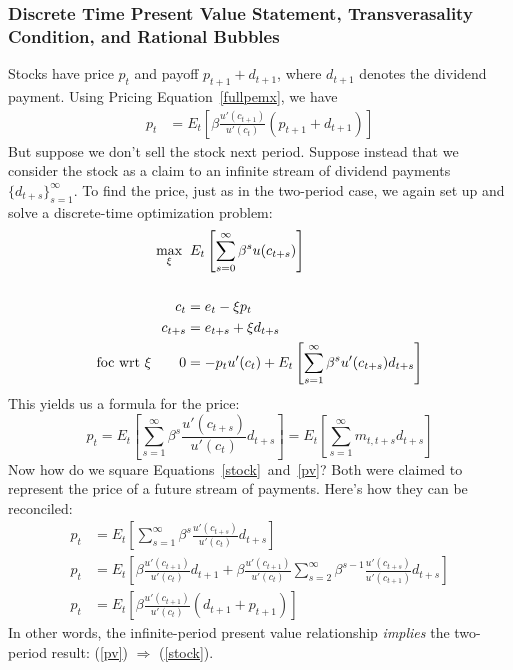 \documentclass[12pt]{article}
\theoremstyle{plain}
\theoremstyle{definition}
\theoremstyle{remark}
\begin{document}
\subsubsection{Discrete Time Present Value Statement, Transverasality
Condition, and Rational Bubbles}

Stocks have price $p_t$ and payoff $p_{t+1} + d_{t+1}$, where $d_{t+1}$
denotes the dividend payment. Using Pricing Equation~\ref{fullpemx}, we
have
\begin{align}
  p_t &= E_t\left[
  \beta\frac{u'(c_{t+1})}{u'(c_{t})} (p_{t+1}+d_{t+1}) \right]
  \label{stock}
\end{align}
But suppose we don't sell the stock next period. Suppose instead that we
consider the stock as a claim to an infinite stream of dividend payments
$\{d_{t+s}\}_{s=1}^\infty$. To find the price, just as in the two-period
case, we again set up and solve a discrete-time optimization problem:
\begin{align}
  \max_{\xi} \; & \;
  E_t \left[ \sum^\infty_{s=0} \beta^s u(c_{t+s}) \right]
  \label{infobjfcn}\\\notag\\
    c_t &= e_t - \xi p_t \notag \\
    c_{t+s} &= e_{t+s} + \xi d_{t+s} \notag \\
    \text{foc wrt $\xi$} \qquad 0 &= -p_t u'(c_t) +
  E_t \left[\sum^\infty_{s=1} \beta^s u'(c_{t+s}) d_{t+s}\right]
\end{align}
This yields us a formula for the price:
\begin{equation}
    p_t =
    E_t \left[\sum^\infty_{s=1} \beta^s \frac{u'(c_{t+s})}{u'(c_t)}
    d_{t+s}\right]
    =
    E_t \left[\sum^\infty_{s=1} m_{t,t+s} d_{t+s}\right]
    \label{pv}
\end{equation}
Now how do we square Equations~\ref{stock}~and~\ref{pv}? Both were
claimed to represent the price of a future stream of payments. Here's
how they can be reconciled:
\begin{align*}
  p_t
  &= E_t \left[
    \sum^\infty_{s=1} \beta^s \frac{u'(c_{t+s})}{u'(c_t)} d_{t+s}
  \right] \\
  p_t&= E_t \left[
  \beta \frac{u'(c_{t+1})}{u'(c_t)} d_{t+1}
  + \beta \frac{u'(c_{t+1})}{u'(c_t)}
  \sum^\infty_{s=2} \beta^{s-1} \frac{u'(c_{t+s})}{u'(c_{t+1})} d_{t+s}
  \right] \\
  p_t&= E_t \left[
  \beta \frac{u'(c_{t+1})}{u'(c_t)} (d_{t+1} +p_{t+1})
  \right]
\end{align*}
In other words, the infinite-period present value relationship
\emph{implies} the two-period result: (\ref{pv}) $\Rightarrow$
(\ref{stock}).
\end{document}
